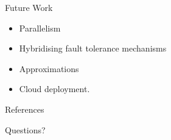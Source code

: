 \documentclass{beamer}
\begin{document}
\begin{frame}{Future Work}
\begin{itemize}
	\item Parallelism
	\item Hybridising fault tolerance mechanisms
	\item Approximations
	\item Cloud deployment.
\end{itemize}
\end{frame}

\begin{frame}[allowframebreaks]{References}


\end{frame}

\begin{frame}{Questions?}
\end{frame}
\end{document}
